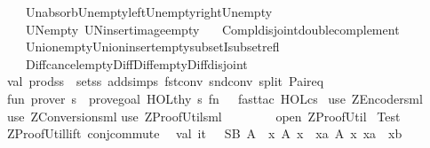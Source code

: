 \begin{isabellebody}
\ \ \ Un{\isacharunderscore}absorb{\isacharcomma}Un{\isacharunderscore}empty{\isacharunderscore}left{\isacharcomma}Un{\isacharunderscore}empty{\isacharunderscore}right{\isacharcomma}Un{\isacharunderscore}empty{\isacharcomma}\isanewline
\ \ \ UN{\isacharunderscore}empty{\isacharcomma}\ UN{\isacharunderscore}insert{\isacharcomma}image{\isacharunderscore}empty{\isacharcomma}\isanewline
\ \ \ Compl{\isacharunderscore}disjoint{\isacharcomma}double{\isacharunderscore}complement{\isacharcomma}\isanewline
\ \ \ Union{\isacharunderscore}empty{\isacharcomma}Union{\isacharunderscore}insert{\isacharcomma}empty{\isacharunderscore}subsetI{\isacharcomma}subset{\isacharunderscore}refl{\isacharcomma}\isanewline
\ \ \ Diff{\isacharunderscore}cancel{\isacharcomma}empty{\isacharunderscore}Diff{\isacharcomma}Diff{\isacharunderscore}empty{\isacharcomma}Diff{\isacharunderscore}disjoint{\isacharbrackright}{\isacharsemicolon}\isanewline
\isanewline
val\ prod{\isacharunderscore}ss\ {\isacharequal}\ set{\isacharunderscore}ss\ addsimps\ {\isacharbrackleft}fst{\isacharunderscore}conv{\isacharcomma}\ snd{\isacharunderscore}conv{\isacharcomma}\ split{\isacharcomma}\ Pair{\isacharunderscore}eq{\isacharbrackright}{\isacharsemicolon}\isanewline
\isanewline
fun\ prover\ s\ {\isacharequal}\ prove{\isacharunderscore}goal\ HOL{\isachardot}thy\ s\ {\isacharparenleft}fn\ {\isacharunderscore}\ {\isacharequal}{\isachargreater}\ {\isacharbrackleft}fast{\isacharunderscore}tac\ HOL{\isacharunderscore}cs\ {}{\isacharbrackright}{\isacharparenright}{\isacharsemicolon}\isanewline
\isanewline
{\isacharverbatimclose}\isanewline
\isanewline
\isanewline
{}\isamarkupfalse%
{\isacharverbatimopen}\isanewline
use\ {\isachardoublequote}ZEncoder{\isachardot}sml{\isachardoublequote}{\isacharsemicolon}\isanewline
use\ {\isachardoublequote}ZConversion{\isachardot}sml{\isachardoublequote}{\isacharsemicolon}\isanewline
\isanewline
use\ {\isachardoublequote}ZProofUtil{\isachardot}sml{\isachardoublequote}{\isacharsemicolon}\ \ \ \ \ \ \ \ \isanewline
open\ ZProofUtil{\isacharsemicolon}\isanewline
\isanewline
{\isacharparenleft}{\isacharasterisk}\ Test\ {\isacharasterisk}{\isacharparenright}\isanewline
ZProofUtil{\isachardot}lift\ conj{\isacharunderscore}commute\ {}{\isacharsemicolon}\ \isanewline
{\isacharparenleft}{\isacharasterisk}val\ it\ {\isacharequal}\ \ {\isachardoublequote}{\isacharparenleft}SB\ {\isacharquery}A\ {\isachartilde}{\isachartilde}{\isachargreater}\ x{\isacharcomma}\ {\isacharquery}A{}\ x\ {\isachartilde}{\isachartilde}{\isachargreater}\ xa{\isacharcomma}\ {\isacharquery}A{}\ x\ xa\ {\isachartilde}{\isachartilde}{\isachargreater}\ xb{\isacharcomma}\isanewline

\end{isabellebody}
